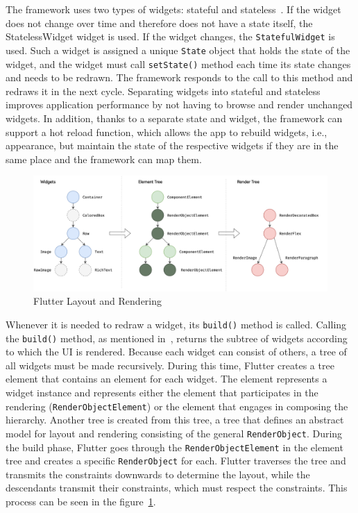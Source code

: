 The framework uses two types of widgets: stateful and stateless~\cite{a2022_flutter_architecture}.
If the widget does not change over time and therefore does not have a state itself, the StatelessWidget widget is used.
If the widget changes, the \texttt{StatefulWidget} is used.
Such a widget is assigned a unique \texttt{State} object that holds the state of the widget, and the widget must call \texttt{setState()} method each time its state changes and needs to be redrawn.
The framework responds to the call to this method and redraws it in the next cycle.
Separating widgets into stateful and stateless improves application performance by not having to browse and render unchanged widgets.
In addition, thanks to a separate state and widget, the framework can support a hot reload function, which allows the app to rebuild widgets, i.e., appearance, but maintain the state of the respective widgets if they are in the same place and the framework can map them.

\begin{figure}
    \centering
    \includegraphics[width=1\linewidth]{assets/design/fluttertrees.png}
    \caption{Flutter Layout and Rendering~\cite{a2022_flutter_architecture}}
    \label{fig:design:fluttertrees}
\end{figure}

Whenever it is needed to redraw a widget, its \texttt{build()} method is called.
Calling the \texttt{build()} method, as mentioned in~\cite{a2022_flutter_architecture}, returns the subtree of widgets according to which the UI is rendered.
Because each widget can consist of others, a tree of all widgets must be made recursively.
During this time, Flutter creates a tree element that contains an element for each widget.
The element represents a widget instance and represents either the element that participates in the rendering (\texttt{RenderObjectElement}) or the element that engages in composing the hierarchy.
Another tree is created from this tree, a tree that defines an abstract model for layout and rendering consisting of the general \texttt{RenderObject}.
During the build phase, Flutter goes through the \texttt{RenderObjectElement} in the element tree and creates a specific \texttt{RenderObject} for each.
Flutter traverses the tree and transmits the constraints downwards to determine the layout, while the descendants transmit their constraints, which must respect the constraints.
This process can be seen in the figure~\ref{fig:design:fluttertrees}.

